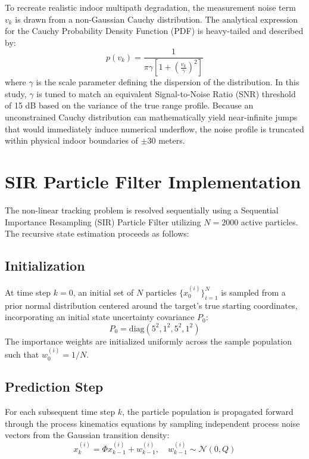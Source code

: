\documentclass[10pt,twocolumn,a4paper]{article}
\begin{document}
To recreate realistic indoor multipath degradation, the measurement noise term $v_{k}$ is drawn from a non-Gaussian Cauchy distribution. The analytical expression for the Cauchy Probability Density Function (PDF) is heavy-tailed and described by:
\begin{equation}
    p(v_{k}) = \frac{1}{\pi \gamma \left[1 + \left(\frac{v_{k}}{\gamma}\right)^{2}\right]}
\end{equation}
where $\gamma$ is the scale parameter defining the dispersion of the distribution. In this study, $\gamma$ is tuned to match an equivalent Signal-to-Noise Ratio (SNR) threshold of 15 dB based on the variance of the true range profile. Because an unconstrained Cauchy distribution can mathematically yield near-infinite jumps that would immediately induce numerical underflow, the noise profile is truncated within physical indoor boundaries of $\pm 30$ meters.

\section{SIR Particle Filter Implementation}
The non-linear tracking problem is resolved sequentially using a Sequential Importance Resampling (SIR) Particle Filter utilizing $N = 2000$ active particles. The recursive state estimation proceeds as follows:

\subsection{Initialization}
At time step $k = 0$, an initial set of $N$ particles $\{x_0^{(i)}\}_{i=1}^N$ is sampled from a prior normal distribution centered around the target's true starting coordinates, incorporating an initial state uncertainty covariance $P_0$:
\begin{equation}
    P_0 = \text{diag}(5^2, 1^2, 5^2, 1^2)
\end{equation}
The importance weights are initialized uniformly across the sample population such that $w_0^{(i)} = 1/N$.

\subsection{Prediction Step}
For each subsequent time step $k$, the particle population is propagated forward through the process kinematics equations by sampling independent process noise vectors from the Gaussian transition density:
\begin{equation}
    x_{k}^{(i)} = \Phi x_{k-1}^{(i)} + w_{k-1}^{(i)}, \quad w_{k-1}^{(i)} \sim \mathcal{N}(0, Q)
\end{equation}
\end{document}
